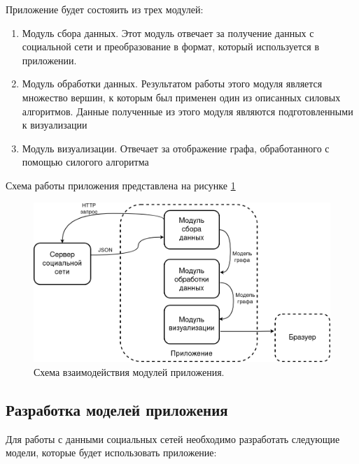 \documentclass[14pt, russian]{scrartcl}
\begin{document}
Приложение будет состояить из трех модулей:

\begin{enumerate}
  \item{Модуль сбора данных. Этот модуль отвечает за получение данных с социальной сети и преобразование в формат, который используется в приложении.}
  \item{Модуль обработки данных. Результатом работы этого модуля является множество вершин, к которым был применен один из описанных силовых алгоритмов. Данные полученные из этого модуля являются подготовленными к визуализации}
  \item{Модуль визуализации. Отвечает за отображение графа, обработанного с помощью силогого алгоритма}
\end{enumerate}


Схема работы приложения представлена на рисунке \ref{fig:app_scheme}


\begin{figure}[H]
\centering
  \begin{minipage}[t]{.9\textwidth}
  \centering
\includegraphics[width=.9\textwidth]{./imgs/app_scheme.png}
  \end{minipage}
\caption{Схема взаимодействия модулей приложения.}
\label{fig:app_scheme}
\end{figure}


\newpage 

\subsection{Разработка моделей приложения}

Для работы с данными социальных сетей необходимо разработать следующие модели, которые будет использовать приложение:
\end{document}

